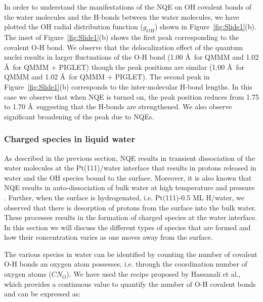 In order to understand the manifestations of the NQE on OH covalent bonds of
the water molecules and the H-bonds between the water molecules, we have
plotted the OH radial distribution function ($g_{OH}$) shown
in Figure~\ref{fig:Slide1}(b). The inset of Figure~\ref{fig:Slide1}(b)
shows the first peak corresponding to the covalent O-H bond. We
observe that the delocalization effect of the quantum nuclei results
in larger fluctuations of the O-H bond (1.00 \AA~for QMMM
and 1.02 \AA~for QMMM $+$ PIGLET) though the peak positions are similar (1.00 \AA~for QMMM
and 1.02 \AA~for QMMM $+$ PIGLET). The second peak in Figure~\ref{fig:Slide1}(b) corresponds to the inter-molecular H-bond lengths. In this case we observe that when NQE
is turned on, the peak position reduces from 1.75 to 1.70 \AA~suggesting
that the H-bonds are strengthened. We also observe significant broadening of the peak due to NQEs.


\subsubsection{Charged species in liquid water}

As described in the previous section, NQE results in transient 
dissociation of the water molecules at the Pt(111)/water interface
that results in protons released in water and the OH species
bound to the surface. Moreover, it is also known that NQE results in
auto-dissociation of bulk water at high temperature and pressure \cite{ceriotti2016nuclear}. Further, when the surface is 
hydrogenated, i.e. Pt(111)-0.5 ML H/water, we observed that there is 
desorption of protons from the surface into the bulk water. These processes results in the formation
of charged species at the water interface. In this section we will discuss
the different types of species that are formed and how their concentration
varies as one moves away from the surface.

The various species in water can be identified by counting the number of covalent O-H bonds an oxygen atom possesses, i.e. through the coordination number of oxygen atoms ($CN_{O}$). We have used the recipe proposed by Hassanali et al.\cite{hassanali2011recombination}, which provides a continuous value to quantify the number of O-H covalent bonds and
can be expressed as:

